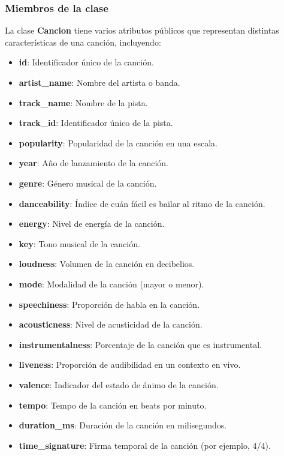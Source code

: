 \documentclass[12pt]{article}
\begin{document}
\begin{flushleft}
            \subsubsection{Miembros de la clase}
            
                \noindent\hspace*{4em}La clase \textbf{Cancion} tiene varios atributos públicos que representan distintas características de una canción, incluyendo:
                
                \begin{itemize}[left=4em]
                    \item \textbf{id}: Identificador único de la canción.
                    \item \textbf{artist\_name}: Nombre del artista o banda.
                    \item \textbf{track\_name}: Nombre de la pista.
                    \item \textbf{track\_id}: Identificador único de la pista.
                    \item \textbf{popularity}: Popularidad de la canción en una escala.
                    \item \textbf{year}: Año de lanzamiento de la canción.
                    \item \textbf{genre}: Género musical de la canción.
                    \item \textbf{danceability}: Índice de cuán fácil es bailar al ritmo de la canción.
                    \item \textbf{energy}: Nivel de energía de la canción.
                    \item \textbf{key}: Tono musical de la canción.
                    \item \textbf{loudness}: Volumen de la canción en decibelios.
                    \item \textbf{mode}: Modalidad de la canción (mayor o menor).
                    \item \textbf{speechiness}: Proporción de habla en la canción.
                    \item \textbf{acousticness}: Nivel de acusticidad de la canción.
                    \item \textbf{instrumentalness}: Porcentaje de la canción que es instrumental.
                    \item \textbf{liveness}: Proporción de audibilidad en un contexto en vivo.
                    \item \textbf{valence}: Indicador del estado de ánimo de la canción.
                    \item \textbf{tempo}: Tempo de la canción en beats por minuto.
                    \item \textbf{duration\_ms}: Duración de la canción en milisegundos.
                    \item \textbf{time\_signature}: Firma temporal de la canción (por ejemplo, 4/4).
                \end{itemize}
            

\end{flushleft}
\end{document}
